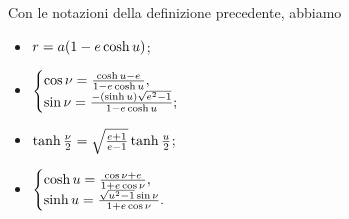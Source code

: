 \begin{Theorem}
  \label{ElementiDiMeccanicaCeleste_ThTrueEccentricHyperbolic}
	Con le notazioni della definizione precedente, abbiamo
	\begin{itemize}
		\item $r = a(1 - e \cosh{u})$;
		\item
		$
			\begin{cases}
				\cos{\nu}
          = \frac{\cosh{u} - e}
              {1 - e \cosh{u}},\\
				\sin{\nu}
          = \frac{- (\sinh{u})\sqrt{e^2 - 1}}
            {1 - e \cosh{u}}; 
			\end{cases}
		$
    \item $\tanh \frac{\nu}{2}
            = \sqrt{\frac{e + 1}{e - 1}}
              \tanh \frac{u}{2}$;
    \item
    $
      \begin{cases}
        \cosh{u}
          = \frac{\cos{\nu} + e}
              {1 + e \cos{\nu}},\\
        \sinh{u}
          = \frac{\sqrt{u^2 - 1} \sin{\nu}}
              {1 + e \cos{\nu}}.
      \end{cases}
    $
	\end{itemize}
\end{Theorem}
